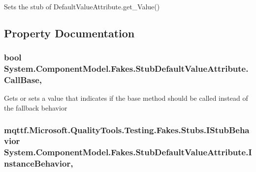Sets the stub of Default\-Value\-Attribute.\-get\-\_\-\-Value()



\subsection{Property Documentation}
\hypertarget{class_system_1_1_component_model_1_1_fakes_1_1_stub_default_value_attribute_ac3af208d38732ceece3eb1fc4e20eb85}{
\subsubsection[{Call\-Base}]{\setlength{\rightskip}{0pt plus 5cm}bool System.\-Component\-Model.\-Fakes.\-Stub\-Default\-Value\-Attribute.\-Call\-Base\hspace{0.3cm}{\ttfamily [get]}, {\ttfamily [set]}}}\label{class_system_1_1_component_model_1_1_fakes_1_1_stub_default_value_attribute_ac3af208d38732ceece3eb1fc4e20eb85}


Gets or sets a value that indicates if the base method should be called instead of the fallback behavior

\hypertarget{class_system_1_1_component_model_1_1_fakes_1_1_stub_default_value_attribute_a9a37c6c63aa5562a689e4ed3cbbaaf03}{
\subsubsection[{Instance\-Behavior}]{\setlength{\rightskip}{0pt plus 5cm}mqttf.\-Microsoft.\-Quality\-Tools.\-Testing.\-Fakes.\-Stubs.\-I\-Stub\-Behavior System.\-Component\-Model.\-Fakes.\-Stub\-Default\-Value\-Attribute.\-Instance\-Behavior\hspace{0.3cm}{\ttfamily [get]}, {\ttfamily [set]}}}\label{class_system_1_1_component_model_1_1_fakes_1_1_stub_default_value_attribute_a9a37c6c63aa5562a689e4ed3cbbaaf03}



